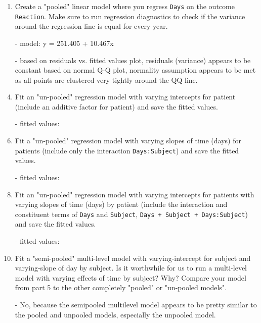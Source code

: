 \documentclass[12pt,letterpaper]{article}
\begin{document}
\begin{enumerate}
	\item
	Create a "pooled" linear model where you regress \texttt{Days} on the outcome \texttt{Reaction}. Make sure to run regression diagnostics to check if the variance around the regression line is equal for every year.
	
	\item[-] model: y = 251.405 + 10.467x
	
	\item[-] based on residuals vs. fitted values plot, residuals (variance) appears to be constant based on normal Q-Q plot, normality assumption appears to be met as all points are clustered very tightly around the QQ line.
	
	
	\item Fit an "un-pooled" regression model with varying intercepts for patient (include an additive factor for patient) and save the fitted values.
	
	\item[-] fitted values:
	
	
	\item Fit a "un-pooled" regression model with varying slopes of time (days) for patients (include only the interaction \texttt{Days:Subject}) and save the fitted values.
	
	\item[-] fitted values:
	
	
	\item Fit an "un-pooled" regression model with varying intercepts for patients with varying slopes of time (days) by patient (include the interaction and constituent terms of \texttt{Days} and \texttt{Subject}, \texttt{Days + Subject + Days:Subject}) and save the fitted values.
	
	\item[-] fitted values:
	
	
	\item Fit a "semi-pooled" multi-level model with varying-intercept for subject and varying-slope of day by subject. Is it worthwhile for us to run a multi-level model with varying effects of time by subject? Why? Compare your model from part 5 to the other completely "pooled" or "un-pooled models".
	
	\item[-] No, because the semipooled multilevel model appears to be pretty similar to the pooled and unpooled models, especially the unpooled model.

\end{enumerate}
\end{document}
